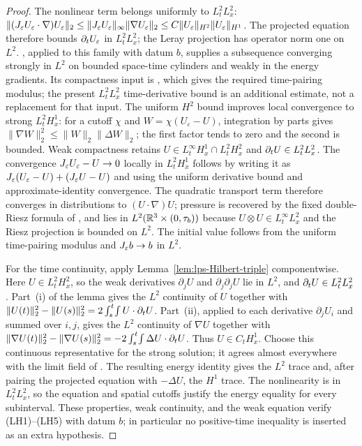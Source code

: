 \documentclass[11pt,letterpaper]{article}
\numberwithin{equation}{section}
\theoremstyle{plain}
\theoremstyle{definition}
\theoremstyle{remark}
\begin{document}
\begin{proof}
The nonlinear term belongs uniformly to $L^2_tL^2_x$:
$\|(J_\varepsilon U_\varepsilon\cdot\nabla)U_\varepsilon\|_2
\le\|J_\varepsilon U_\varepsilon\|_\infty\|\nabla U_\varepsilon\|_2
\le C\|U_\varepsilon\|_{H^2}\|U_\varepsilon\|_{H^1}$.
The projected equation therefore bounds $\partial_t U_\varepsilon$ in
$L^2_tL^2_x$; the Leray projection has operator norm one on $L^2$.
\cite[Proposition~12.1]{CKNLean}, applied to this family with datum
$b$, supplies a subsequence converging strongly in $L^2$ on bounded
space-time cylinders and weakly in the energy gradients. Its compactness
input is \cite[Lemma~10.6]{CKNLean}, which gives the required
time-pairing modulus; the present $L^2_tL^2_x$ time-derivative bound is
an additional estimate, not a replacement for that input. The uniform
$H^2$ bound improves local convergence
to strong $L^2_tH^1_x$: for a cutoff $\chi$ and
$W=\chi(U_\varepsilon-U)$, integration by parts gives
$\|\nabla W\|_2^2\le\|W\|_2\|\Delta W\|_2$;
the first factor tends to zero and the second is bounded. Weak
compactness retains $U\in L^\infty_tH^1_x\cap L^2_tH^2_x$ and
$\partial_t U\in L^2_tL^2_x$. The convergence
$J_\varepsilon U_\varepsilon-U\to0$ locally in $L^2_tH^1_x$ follows by
writing it as $J_\varepsilon(U_\varepsilon-U)+(J_\varepsilon U-U)$ and using the
uniform derivative bound and approximate-identity convergence. The
quadratic transport term therefore converges in distributions to
$(U\cdot\nabla)U$; pressure is recovered by the fixed double-Riesz
formula of \cite[Section~8]{CKNLean}, and lies in
$L^2(\mathbb{R}^3\times(0,\tau_b))$ because $U\otimes U\in L^\infty_tL^2_x$ and the
Riesz projection is bounded on $L^2$. The initial value follows from
the uniform time-pairing modulus and $J_\varepsilon b\to b$ in $L^2$.

For the time continuity, apply Lemma~\ref{lem:lps-Hilbert-triple}
componentwise. Here $U\in L^2_tH^2_x$, so the weak derivatives $\partial_jU$
and $\partial_j\partial_jU$ lie in $L^2$, and $\partial_t U\in L^2_tL^2_x$. Part~(i)
of the lemma gives the $L^2$ continuity of $U$ together with
$\|U(t)\|_2^2-\|U(s)\|_2^2=2\int_s^t\!\int U\cdot\partial_t U$. Part~(ii), applied to
each derivative $\partial_jU_i$ and summed over $i,j$, gives the $L^2$
continuity of $\nabla U$ together with
$\|\nabla U(t)\|_2^2-\|\nabla U(s)\|_2^2
=-2\int_s^t\!\int\Delta U\cdot\partial_t U$. Thus $U\in C_tH^1_x$. Choose this
continuous representative for the strong solution;
it agrees almost everywhere with the limit field of
\cite[Proposition~12.1]{CKNLean}. The resulting energy identity
gives the $L^2$ trace and, after pairing
the projected equation with $-\Delta U$, the $H^1$ trace. The
nonlinearity is in $L^2_tL^2_x$, so the equation and spatial cutoffs
justify the energy equality for every subinterval. These properties,
weak continuity, and the weak equation verify (LH1)--(LH5) with datum
$b$; in particular no positive-time inequality is inserted as an
extra hypothesis.
\end{proof}
\end{document}
